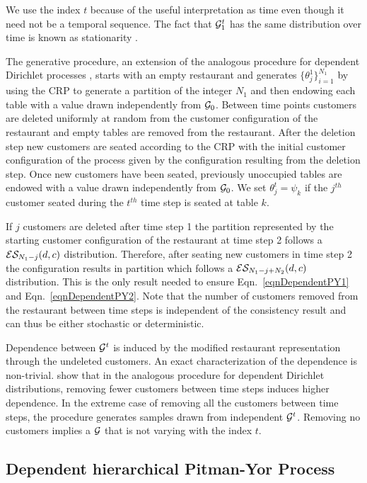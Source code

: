 We use the index $t$ because of the useful interpretation as time even though it need not be a temporal sequence. The fact that $\G^t_1$ has the same distribution over time is known as stationarity \cite{davis and brockwel}.  
 
The generative procedure, an extension of the analogous procedure for dependent Dirichlet processes \cite{caron}, starts with an empty restaurant and generates $\{ \theta_j^1\}_{i = 1}^{N_1}$ by using the CRP to generate a partition of the integer $N_1$ and then endowing each table with a value drawn independently from $\G_0$.  Between time points customers are deleted uniformly at random from the customer configuration of the restaurant and empty tables are removed from the restaurant.  After the deletion step new customers are seated according to the CRP with the initial customer configuration of the process given by the configuration resulting from the deletion step.  Once new customers have been seated, previously unoccupied tables are endowed with a value drawn independently from $\G_0$.  We set $\theta^t_j = \psi_k$ if  the $j^{th}$ customer seated during the $t^{th}$ time step is seated at table $k$.

If $j$ customers are deleted after time step 1 the partition represented by the starting customer configuration of the restaurant at time step 2 follows a $\ES_{N_1- j}(d,c)$ distribution.  Therefore, after seating new customers in time step 2 the configuration results in partition which follows a $\ES_{N_1 - j + N_2}(d,c)$ distribution.  This is the only result needed to ensure Eqn.~\ref{eqnDependentPY1} and Eqn.~\ref{eqnDependentPY2}.  Note that the number of customers removed from the restaurant between time steps is independent of the consistency result and can thus be either stochastic or deterministic.

Dependence between $\G^t$ is induced by the modified restaurant representation through the undeleted customers.  An exact characterization of the dependence is non-trivial.   \cite{caron} show that in the analogous procedure for dependent Dirichlet distributions, removing fewer customers between time steps induces higher dependence.  In the extreme case of removing all the customers between time steps, the procedure generates samples drawn from independent $\G^t$. Removing no customers implies a $\G$ that is not varying with the index $t$. 

\subsection{Dependent hierarchical Pitman-Yor Process}
\label{sec:dhpyp}


